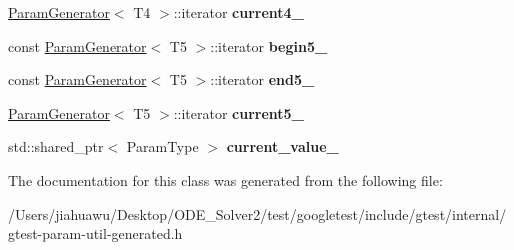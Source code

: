 \begin{DoxyCompactItemize}
\item 
\mbox{\label{classtesting_1_1internal_1_1_cartesian_product_generator5_1_1_iterator_a0fce691dadd17d9ec6bc2d09fd8906a5}} 
\mbox{\hyperlink{classtesting_1_1internal_1_1_param_generator}{Param\+Generator}}$<$ T4 $>$\+::iterator {\bfseries current4\+\_\+}
\item 
\mbox{\label{classtesting_1_1internal_1_1_cartesian_product_generator5_1_1_iterator_a552be8f7e42ab6fb1e9c07d49d660d02}} 
const \mbox{\hyperlink{classtesting_1_1internal_1_1_param_generator}{Param\+Generator}}$<$ T5 $>$\+::iterator {\bfseries begin5\+\_\+}
\item 
\mbox{\label{classtesting_1_1internal_1_1_cartesian_product_generator5_1_1_iterator_ad048a7619cf82e9457bcde096970d296}} 
const \mbox{\hyperlink{classtesting_1_1internal_1_1_param_generator}{Param\+Generator}}$<$ T5 $>$\+::iterator {\bfseries end5\+\_\+}
\item 
\mbox{\label{classtesting_1_1internal_1_1_cartesian_product_generator5_1_1_iterator_a2a6b4ba75ba79eb74cb05f4ac80f1cb3}} 
\mbox{\hyperlink{classtesting_1_1internal_1_1_param_generator}{Param\+Generator}}$<$ T5 $>$\+::iterator {\bfseries current5\+\_\+}
\item 
\mbox{\label{classtesting_1_1internal_1_1_cartesian_product_generator5_1_1_iterator_ae2fcf3547b56f2805c82ef0aae014ca5}} 
std\+::shared\+\_\+ptr$<$ Param\+Type $>$ {\bfseries current\+\_\+value\+\_\+}
\end{DoxyCompactItemize}


The documentation for this class was generated from the following file\+:\begin{DoxyCompactItemize}
\item 
/\+Users/jiahuawu/\+Desktop/\+O\+D\+E\+\_\+\+Solver2/test/googletest/include/gtest/internal/gtest-\/param-\/util-\/generated.\+h\end{DoxyCompactItemize}
